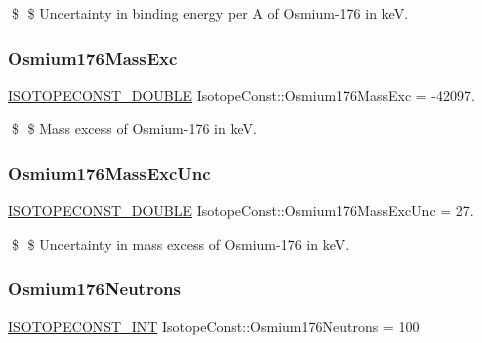 \$ \$ Uncertainty in binding energy per A of Osmium-\/176 in keV. \mbox{\label{group___isotope_const-_osmium-_os176_gac465e22f9e5aa46b5596cdb0a03a061b}} 
\subsubsection{\texorpdfstring{Osmium176\+Mass\+Exc}{Osmium176MassExc}}
{\footnotesize\ttfamily \mbox{\hyperlink{group___isotope_const-_macros_ga8f45a7272ce02c0b4c65c44636ed719a}{I\+S\+O\+T\+O\+P\+E\+C\+O\+N\+S\+T\+\_\+\+D\+O\+U\+B\+LE}} Isotope\+Const\+::\+Osmium176\+Mass\+Exc = -\/42097.}

\$ \$ Mass excess of Osmium-\/176 in keV. \mbox{\label{group___isotope_const-_osmium-_os176_ga1702a11248a3d801b81dc493aedbbc2d}} 
\subsubsection{\texorpdfstring{Osmium176\+Mass\+Exc\+Unc}{Osmium176MassExcUnc}}
{\footnotesize\ttfamily \mbox{\hyperlink{group___isotope_const-_macros_ga8f45a7272ce02c0b4c65c44636ed719a}{I\+S\+O\+T\+O\+P\+E\+C\+O\+N\+S\+T\+\_\+\+D\+O\+U\+B\+LE}} Isotope\+Const\+::\+Osmium176\+Mass\+Exc\+Unc = 27.}

\$ \$ Uncertainty in mass excess of Osmium-\/176 in keV. \mbox{\label{group___isotope_const-_osmium-_os176_ga1634f31c4473b7ce7aef735b67169339}} 
\subsubsection{\texorpdfstring{Osmium176\+Neutrons}{Osmium176Neutrons}}
{\footnotesize\ttfamily \mbox{\hyperlink{group___isotope_const-_macros_ga5f18360b3e99483a35c32d789e62621c}{I\+S\+O\+T\+O\+P\+E\+C\+O\+N\+S\+T\+\_\+\+I\+NT}} Isotope\+Const\+::\+Osmium176\+Neutrons = 100}

